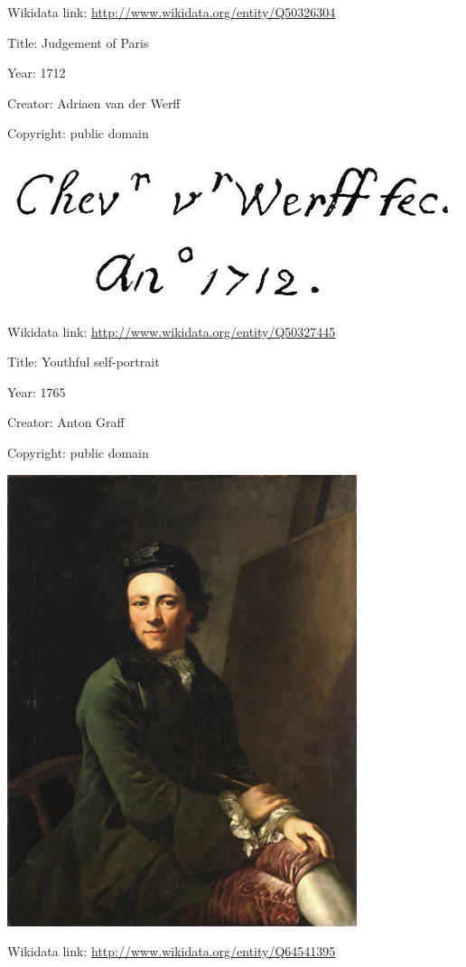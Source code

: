 \documentclass[
  letterpaper,
]{book}
\begin{document}
Wikidata link: \url{http://www.wikidata.org/entity/Q50326304}

Title: Judgement of Paris

Year: 1712

Creator: Adriaen van der Werff

Copyright: public domain

\includegraphics{paintings_files/figure-pdf/cell-2-output-14.png}

Wikidata link: \url{http://www.wikidata.org/entity/Q50327445}

Title: Youthful self-portrait

Year: 1765

Creator: Anton Graff

Copyright: public domain

\includegraphics{paintings_files/figure-pdf/cell-2-output-16.png}

Wikidata link: \url{http://www.wikidata.org/entity/Q64541395}
\end{document}
